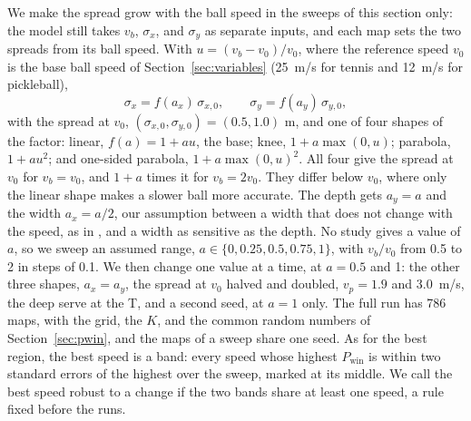 
  We make the spread grow with the ball speed in the sweeps of this section
  only: the model still takes $v_b$, $\sigma_x$, and $\sigma_y$ as separate
  inputs, and each map sets the two spreads from its ball speed. With $u = (v_b
  - v_0) / v_0$, where the reference speed $v_0$ is the base ball speed of
  Section~\ref{sec:variables} (25~m/s for tennis and 12~m/s for pickleball),
  \begin{equation}
  \sigma_x = f(a_x) \, \sigma_{x,0}, \qquad \sigma_y = f(a_y) \, \sigma_{y,0},
  \end{equation}
  with the spread at $v_0$, $(\sigma_{x,0}, \sigma_{y,0}) = (0.5, 1.0)$ m, and
  one of four shapes of the factor: linear, $f(a) = 1 + a u$, the base; knee,
  $1 + a \max(0, u)$; parabola, $1 + a u^2$; and one-sided parabola, $1 + a
  \max(0, u)^2$. All four give the spread at $v_0$ for $v_b = v_0$, and $1 + a$
  times it for $v_b = 2 v_0$. They differ below $v_0$, where only the linear
  shape makes a slower ball more accurate. The depth gets $a_y = a$ and the
  width $a_x = a / 2$, our assumption between a width that does not change with
  the speed, as in \cite{sudo2024speedaccuracy}, and a width as sensitive as
  the depth. No study gives a value of $a$, so we sweep an assumed range, $a \in
  \{0, 0.25, 0.5, 0.75, 1\}$, with $v_b / v_0$ from 0.5 to 2 in steps of 0.1. We
  then change one value at a time, at $a = 0.5$ and 1: the other three shapes,
  $a_x = a_y$, the spread at $v_0$ halved and doubled, $v_p = 1.9$ and
  3.0~m/s, the deep serve at the T, and a second seed, at $a = 1$ only. The full
  run has 786 maps, with the grid, the $K$, and the common random numbers of
  Section~\ref{sec:pwin}, and the maps of a sweep share one seed. As for the
  best region, the best speed is a band: every speed whose highest
  $P_{\mathrm{win}}$ is within two standard errors of the highest over the
  sweep, marked at its middle. We call the best speed robust to a change if the
  two bands share at least one speed, a rule fixed before the runs.

